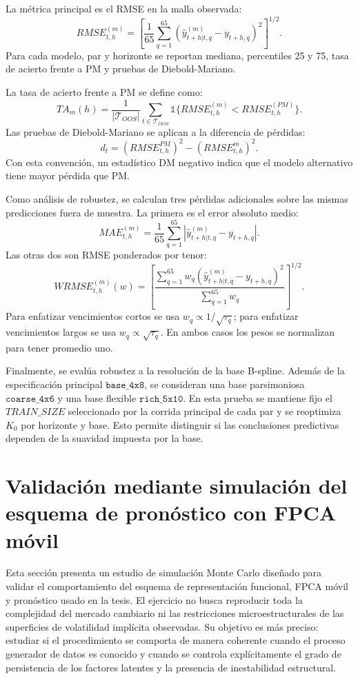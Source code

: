 \documentclass[a4paper,11pt]{article}
\newcommand{\SVIs}{superficies de volatilidad implícita}
\begin{document}
La métrica principal es el RMSE en la malla observada:
\[
  RMSE_{t,h}^{(m)}
  =
  \left[
  \frac{1}{65}\sum_{q=1}^{65}
  \left(
  \widehat y_{t+h|t,q}^{(m)}-y_{t+h,q}
  \right)^2
  \right]^{1/2}.
\]
Para cada modelo, par y horizonte se reportan mediana, percentiles 25 y 75, tasa de acierto frente a PM y pruebas de Diebold-Mariano.

La tasa de acierto frente a PM se define como:
\[
  TA_m(h)=
  \frac{1}{|\mathcal{T}_{OOS}|}
  \sum_{t\in\mathcal{T}_{OOS}}
  \mathbb{1}\{RMSE_{t,h}^{(m)}<RMSE_{t,h}^{(PM)}\}.
\]
Las pruebas de Diebold-Mariano se aplican a la diferencia de pérdidas:
\[
  d_t=(RMSE_{t,h}^{PM})^2-(RMSE_{t,h}^{m})^2.
\]
Con esta convención, un estadístico DM negativo indica que el modelo alternativo tiene mayor pérdida que PM.

Como análisis de robustez, se calculan tres pérdidas adicionales sobre las mismas predicciones fuera de muestra. La primera es el error absoluto medio:
\[
  MAE_{t,h}^{(m)}
  =
  \frac{1}{65}\sum_{q=1}^{65}
  \left|
  \widehat y_{t+h|t,q}^{(m)}-y_{t+h,q}
  \right|.
\]
Las otras dos son RMSE ponderados por tenor:
\[
  WRMSE_{t,h}^{(m)}(w)
  =
  \left[
  \frac{\sum_{q=1}^{65}w_q
  \left(
  \widehat y_{t+h|t,q}^{(m)}-y_{t+h,q}
  \right)^2}{\sum_{q=1}^{65}w_q}
  \right]^{1/2}.
\]
Para enfatizar vencimientos cortos se usa \(w_q\propto 1/\sqrt{\tau_q}\); para enfatizar vencimientos largos se usa \(w_q\propto \sqrt{\tau_q}\). En ambos casos los pesos se normalizan para tener promedio uno.

Finalmente, se evalúa robustez a la resolución de la base B-spline. Además de la especificación principal \(\texttt{base\_4x8}\), se consideran una base parsimoniosa \(\texttt{coarse\_4x6}\) y una base flexible \(\texttt{rich\_5x10}\). En esta prueba se mantiene fijo el \(TRAIN\_SIZE\) seleccionado por la corrida principal de cada par y se reoptimiza \(K_0\) por horizonte y base. Esto permite distinguir si las conclusiones predictivas dependen de la suavidad impuesta por la base.

\section{Validación mediante simulación del esquema de pronóstico con FPCA móvil}
\label{sec:simulacion}

Esta sección presenta un estudio de simulación Monte Carlo diseñado para validar el comportamiento del esquema de representación funcional, FPCA móvil y pronóstico usado en la tesis. El ejercicio no busca reproducir toda la complejidad del mercado cambiario ni las restricciones microestructurales de las \SVIs{} observadas. Su objetivo es más preciso: estudiar si el procedimiento se comporta de manera coherente cuando el proceso generador de datos es conocido y cuando se controla explícitamente el grado de persistencia de los factores latentes y la presencia de inestabilidad estructural.
\end{document}
